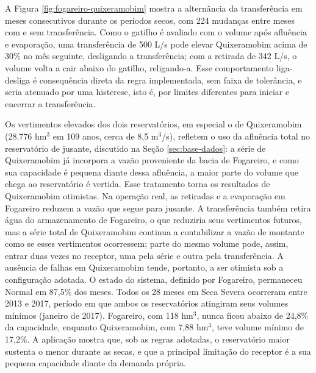 A Figura \ref{fig:fogareiro-quixeramobim} mostra a alternância da transferência em meses consecutivos durante os períodos secos, com 224 mudanças entre meses com e sem transferência. Como o gatilho é avaliado com o volume após afluência e evaporação, uma transferência de 500 L/s pode elevar Quixeramobim acima de 30\% no mês seguinte, desligando a transferência; com a retirada de 342 L/s, o volume volta a cair abaixo do gatilho, religando-a. Esse comportamento liga-desliga é consequência direta da regra implementada, sem faixa de tolerância, e seria atenuado por uma histerese, isto é, por limites diferentes para iniciar e encerrar a transferência.

Os vertimentos elevados dos dois reservatórios, em especial o de Quixeramobim (28.776 hm$^3$ em 109 anos, cerca de 8,5 m$^3$/s), refletem o uso da afluência total no reservatório de jusante, discutido na Seção \ref{sec:base-dados}: a série de Quixeramobim já incorpora a vazão proveniente da bacia de Fogareiro, e como sua capacidade é pequena diante dessa afluência, a maior parte do volume que chega ao reservatório é vertida. Esse tratamento torna os resultados de Quixeramobim otimistas. Na operação real, as retiradas e a evaporação em Fogareiro reduzem a vazão que segue para jusante. A transferência também retira água do armazenamento de Fogareiro, o que reduziria seus vertimentos futuros, mas a série total de Quixeramobim continua a contabilizar a vazão de montante como se esses vertimentos ocorressem; parte do mesmo volume pode, assim, entrar duas vezes no receptor, uma pela série e outra pela transferência. A ausência de falhas em Quixeramobim tende, portanto, a ser otimista sob a configuração adotada. O estado do sistema, definido por Fogareiro, permaneceu Normal em 87,5\% dos meses. Todos os 28 meses em Seca Severa ocorreram entre 2013 e 2017, período em que ambos os reservatórios atingiram seus volumes mínimos (janeiro de 2017). Fogareiro, com 118 hm$^3$, nunca ficou abaixo de 24,8\% da capacidade, enquanto Quixeramobim, com 7,88 hm$^3$, teve volume mínimo de 17,2\%. A aplicação mostra que, sob as regras adotadas, o reservatório maior sustenta o menor durante as secas, e que a principal limitação do receptor é a sua pequena capacidade diante da demanda própria.

